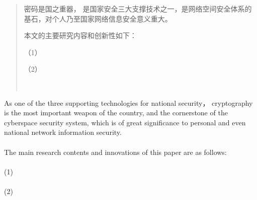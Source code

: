 
\begin{abstract}
密码是国之重器， 是国家安全三大支撑技术之一，是网络空间安全体系的基石，对个人乃至国家网络信息安全意义重大。

本文的主要研究内容和创新性如下：

（1）

（2）


 \\
\end{abstract}

\begin{englishabstract}

As one of the three supporting technologies for national security， cryptography is the most important weapon of the country, and the cornerstone of the cyberspace security system, which is of great significance to personal and even national network information security. 
\\~\\
The main research contents and innovations of this paper are as follows:
\\~\\
(1) 
\\~\\
(2) 
\\~\\


 \\

\end{englishabstract}


\BESTIpremainmatter

